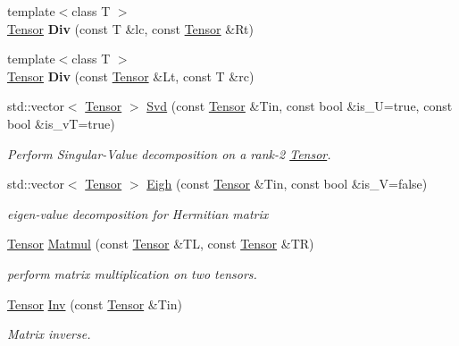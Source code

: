 \begin{DoxyCompactItemize}
\mbox{\label{namespacecytnx_1_1linalg_acb8965e9a67906d0c8064725c7d499a8}} 
{\footnotesize template$<$class T $>$ }\\\hyperlink{classcytnx_1_1Tensor}{Tensor} {\bfseries Div} (const T \&lc, const \hyperlink{classcytnx_1_1Tensor}{Tensor} \&Rt)
\item 
\mbox{\label{namespacecytnx_1_1linalg_a9296701c7aad0456965f42b8ea01ad2e}} 
{\footnotesize template$<$class T $>$ }\\\hyperlink{classcytnx_1_1Tensor}{Tensor} {\bfseries Div} (const \hyperlink{classcytnx_1_1Tensor}{Tensor} \&Lt, const T \&rc)
\item 
std\+::vector$<$ \hyperlink{classcytnx_1_1Tensor}{Tensor} $>$ \hyperlink{namespacecytnx_1_1linalg_ac17f16959a4849ea91bce712d24d4e4e}{Svd} (const \hyperlink{classcytnx_1_1Tensor}{Tensor} \&Tin, const bool \&is\+\_\+U=true, const bool \&is\+\_\+vT=true)
\begin{DoxyCompactList}\small\item\em Perform Singular-\/\+Value decomposition on a rank-\/2 \hyperlink{classcytnx_1_1Tensor}{Tensor}. \end{DoxyCompactList}\item 
std\+::vector$<$ \hyperlink{classcytnx_1_1Tensor}{Tensor} $>$ \hyperlink{namespacecytnx_1_1linalg_aa9f11ed24ef9684fb8d05c228e3852d6}{Eigh} (const \hyperlink{classcytnx_1_1Tensor}{Tensor} \&Tin, const bool \&is\+\_\+V=false)
\begin{DoxyCompactList}\small\item\em eigen-\/value decomposition for Hermitian matrix \end{DoxyCompactList}\item 
\hyperlink{classcytnx_1_1Tensor}{Tensor} \hyperlink{namespacecytnx_1_1linalg_a53feb441b4b1bd263714ed33e093728f}{Matmul} (const \hyperlink{classcytnx_1_1Tensor}{Tensor} \&TL, const \hyperlink{classcytnx_1_1Tensor}{Tensor} \&TR)
\begin{DoxyCompactList}\small\item\em perform matrix multiplication on two tensors. \end{DoxyCompactList}\item 
\hyperlink{classcytnx_1_1Tensor}{Tensor} \hyperlink{namespacecytnx_1_1linalg_a351ad02f478ba8082ee79a37a2a8f108}{Inv} (const \hyperlink{classcytnx_1_1Tensor}{Tensor} \&Tin)
\begin{DoxyCompactList}\small\item\em Matrix inverse. \end{DoxyCompactList}\item 

\end{DoxyCompactItemize}
